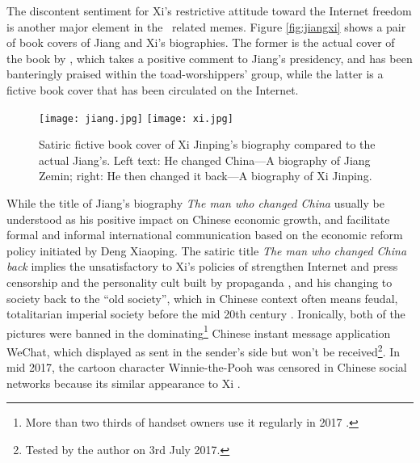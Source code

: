 The discontent sentiment for Xi's restrictive attitude toward the Internet freedom is another major element in the \moha\ related memes. Figure \vref{fig:jiangxi} shows a pair of book covers of Jiang and Xi's biographies. The former is the actual cover of the book by \citet{kuhn_man_2005}, which takes a positive comment to Jiang's presidency, and has been banteringly praised within the toad-worshippers' group, while the latter is a fictive book cover that has been circulated on the Internet.
\begin{figure}[!htbp]
	\centering
	\texttt{[image: jiang.jpg]}
	\hfill\texttt{[image: xi.jpg]}
	\caption[Satiric fictive book cover of Xi Jinping's biography compared to the actual Jiang's]{Satiric fictive book cover of Xi Jinping's biography compared to the actual Jiang's. Left text: He changed China---A biography of Jiang Zemin; right: He then changed it back---A biography of Xi Jinping.}
	\label{fig:jiangxi}
\end{figure}
While the title of Jiang's biography \textit{The man who changed China} usually be understood as his positive impact on Chinese economic growth, and facilitate formal and informal international communication based on the economic reform policy initiated by Deng Xiaoping. The satiric title \textit{The man who changed China back} implies the unsatisfactory to Xi's policies of strengthen Internet and press censorship and the personality cult built by propaganda \citep{beech_chinas_2016}, and his changing to society back to the ``old society'', which in Chinese context often means feudal, totalitarian imperial society before the mid 20th century \citep{cohen_cultural_1993}. Ironically, both of the pictures were banned in the dominating\footnote{More than two thirds of handset owners use it regularly in 2017 \citep{mcnair_wechat_2017}.} Chinese instant message application WeChat, which displayed as sent in the sender's side but won't be received\footnote{Tested by the author on 3rd July 2017.}. In mid 2017, the cartoon character Winnie-the-Pooh was censored in Chinese social networks because its similar appearance to Xi \citep[see figure \vref{fig:winnie}]{hernandez_winnie--pooh_2017}.

